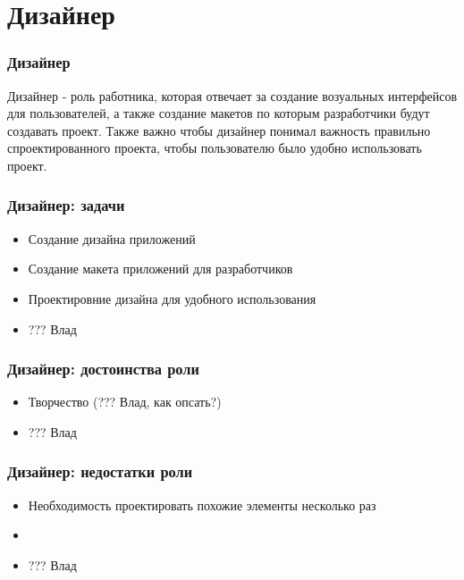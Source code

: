 \documentclass{../industrial-development}
\begin{document}
	\section{Дизайнер }
	
	\begin{frame} \frametitle{Дизайнер}
		\begin{block}{}
			\alert {Дизайнер} - роль работника, которая отвечает за создание возуальных интерфейсов для пользователей, а также создание макетов по которым разработчики будут создавать проект. Также важно чтобы дизайнер понимал важность правильно спроектированного проекта, чтобы пользователю было удобно использовать проект.
		\end{block}
		
	\end{frame}
	
	\begin{frame} \frametitle{Дизайнер: задачи}
		\begin{block}{}
			\begin{itemize}
				\item Создание дизайна приложений
				\item Создание макета приложений для разработчиков
				\item Проектировние дизайна для удобного использования
				\item  ??? Влад
			\end{itemize}
		\end{block}
	\end{frame}
	
	\begin{frame} \frametitle{Дизайнер: достоинства роли}
		\begin{block}{}
			\begin{itemize}
				\item Творчество (??? Влад, как опсать?)
				\item  ??? Влад
			\end{itemize}
		\end{block}
	\end{frame}
	
	\begin{frame} \frametitle{Дизайнер: недостатки роли}
		\begin{block}{}
			\begin{itemize}
				\item Необходимость проектировать похожие элементы несколько раз
				\item 
				\item  ??? Влад
			\end{itemize}
		\end{block}
	\end{frame}
	
\end{document}

